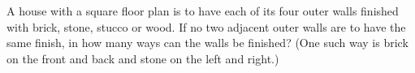A house with a square floor plan is to have each of its four outer walls finished with brick, stone, stucco or wood. If no two adjacent outer walls are to have the same finish, in how many ways can the walls be finished? (One such way is brick on the front and back and stone on the left and right.)
